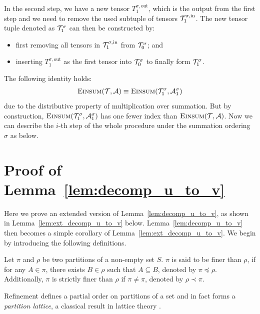 \documentclass[letterpaper,11pt]{article}
\newcommand{\Zhang}[1]{{\color{blue}{Zhang: #1}}}
\newcommand{\sPi}{\pi}
\newcommand{\tensorcontraction}{\textsc{Einsum}}
\newcommand{\pleq}{\preceq}
\newcommand{\pless}{\prec}
\begin{document}
\begin{bibunit}[plainnat]
    In the second step, we have a new tensor $T^{\sigma,\mathrm{out}}_{1}$, which is the output from the first step and we need to remove the used subtuple of tensors ${\mathcal{T}}^{\sigma, \mathrm{in}}_{1}$. The new tensor tuple denoted as ${\mathcal{T}}^{\sigma}_{1}$ can then be constructed by:
    \begin{itemize}
    \item first removing all tensors in ${\mathcal{T}}^{\sigma, \mathrm{in}}_1$ from ${\mathcal{T}}_{0}^{\sigma}$; and
    \item inserting $T^{\sigma,\mathrm{out}}_1$ as the first tensor into ${\mathcal{T}}_{0}^{\sigma}$ to finally form ${\mathcal{T}}^{\sigma}_{1}$.
    \end{itemize}
    \Zhang{the above procedure should have been completed in the first step.}
    The following identity holds:
    \begin{align*}
    \tensorcontraction(\calT, \calA) \equiv \tensorcontraction(\calT^\sigma_1, \calA^\sigma_1) 
    \end{align*}
    due to the distributive property of multiplication over summation. But by construction, $\tensorcontraction(\calT^\sigma_1, \calA^\sigma_1)$ has one fewer index than $\tensorcontraction(\calT, \calA)$. 
    Now we can describe the $i$-th step of the whole procedure under the summation ordering $\sigma$ as below.
\fi


\section{Proof of Lemma~\ref{lem:decomp_u_to_v}}
\label{app:decomp_u_stats}

Here we prove an extended version of Lemma~\ref{lem:decomp_u_to_v}, as shown in Lemma~\ref{lem:ext_decomp_u_to_v} below. Lemma~\ref{lem:decomp_u_to_v} then becomes a simple corollary of Lemma~\ref{lem:ext_decomp_u_to_v}. We begin by introducing the following definitions.

\begin{definition}\label{def:refinement_of_partition}
Let $\sPi$ and $\rho$ be two partitions of a non-empty set $S$. $\sPi$ is said to be finer than $\rho$, if for any $A \in \sPi$, there exists $B \in \rho$ such that $A \subseteq B$, denoted by $\sPi \pleq \rho$. Additionally, $\sPi$ is strictly finer than $\rho$ if $\sPi \neq \sPi$, denoted by $\rho \pless \sPi$. 
\end{definition}

\begin{remark}
Refinement defines a partial order on partitions of a set and in fact forms a \emph{partition lattice}, a classical result in lattice theory \citep{birkhoff1940lattice}. 
\end{remark}


\end{bibunit}
\end{document}
